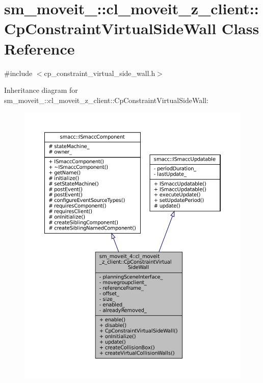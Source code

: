 \hypertarget{classsm__moveit__4_1_1cl__moveit__z__client_1_1CpConstraintVirtualSideWall}{}\section{sm\+\_\+moveit\+\_\+:\+:cl\+\_\+moveit\+\_\+z\+\_\+client\+:\+:Cp\+Constraint\+Virtual\+Side\+Wall Class Reference}
\label{classsm__moveit__4_1_1cl__moveit__z__client_1_1CpConstraintVirtualSideWall}


{\ttfamily \#include $<$cp\+\_\+constraint\+\_\+virtual\+\_\+side\+\_\+wall.\+h$>$}



Inheritance diagram for sm\+\_\+moveit\+\_\+:\+:cl\+\_\+moveit\+\_\+z\+\_\+client\+:\+:Cp\+Constraint\+Virtual\+Side\+Wall\+:
\nopagebreak
\begin{figure}[H]
\begin{center}
\leavevmode
\includegraphics[width=350pt]{classsm__moveit__4_1_1cl__moveit__z__client_1_1CpConstraintVirtualSideWall__inherit__graph}
\end{center}
\end{figure}


